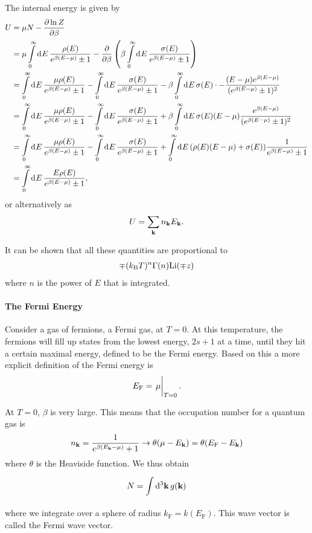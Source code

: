 The internal energy is given by
\begin{align*}
	U &= \mu N - \pdv{\ln{Z}}{\beta} \\
	  &= \mu\int\limits_{0}^{\infty}\dd[]{E}\frac{\rho(E)}{e^{\beta(E - \mu)} \pm 1} - \pdv{\beta}\left(\beta\int\limits_{0}^{\infty}\dd[]{E}\frac{\sigma(E)}{e^{\beta(E - \mu)} \pm 1}\right) \\
	  &= \int\limits_{0}^{\infty}\dd[]{E}\frac{\mu\rho(E)}{e^{\beta(E - \mu)} \pm 1} - \int\limits_{0}^{\infty}\dd[]{E}\frac{\sigma(E)}{e^{\beta(E - \mu)} \pm 1} - \beta\int\limits_{0}^{\infty}\dd[]{E}\sigma(E)\cdot -\frac{(E - \mu)e^{\beta(E - \mu)}}{(e^{\beta(E - \mu)} \pm 1)^{2}} \\
	  &= \int\limits_{0}^{\infty}\dd[]{E}\frac{\mu\rho(E)}{e^{\beta(E - \mu)} \pm 1} - \int\limits_{0}^{\infty}\dd[]{E}\frac{\sigma(E)}{e^{\beta(E - \mu)} \pm 1} + \beta\int\limits_{0}^{\infty}\dd[]{E}\sigma(E)(E - \mu)\frac{e^{\beta(E - \mu)}}{(e^{\beta(E - \mu)} \pm 1)^{2}} \\
	  &= \int\limits_{0}^{\infty}\dd[]{E}\frac{\mu\rho(E)}{e^{\beta(E - \mu)} \pm 1} - \int\limits_{0}^{\infty}\dd[]{E}\frac{\sigma(E)}{e^{\beta(E - \mu)} \pm 1} + \int\limits_{0}^{\infty}\dd[]{E}(\rho(E)(E - \mu) + \sigma(E))\frac{1}{e^{\beta(E - \mu)} \pm 1} \\
	  &= \int\limits_{0}^{\infty}\dd[]{E}\frac{E\rho(E)}{e^{\beta(E - \mu)} \pm 1},
\end{align*}
or alternatively as
\begin{align*}
	U = \sum\limits_{\vb{k}}n_{\vb{k}}E_{\vb{k}}.
\end{align*}

It can be shown that all these quantities are proportional to
\begin{align*}
	\mp(k_{\text{B}} T)^{n}\Gamma(n)\text{Li}(\mp z)
\end{align*}
where $n$ is the power of $E$ that is integrated.

\paragraph{The Fermi Energy}
Consider a gas of fermions, a Fermi gas, at $T = 0$. At this temperature, the fermions will fill up states from the lowest energy, $2s + 1$ at a time, until they hit a certain maximal energy, defined to be the Fermi energy. Based on this a more explicit definition of the Fermi energy is
\begin{align*}
	E_{\text{F}} = \eval{\mu}_{T = 0}.
\end{align*}

At $T = 0$, $\beta$ is very large. This means that the occupation number for a quantum gas is
\begin{align*}
	n_{\vb{k}} = \frac{1}{e^{\beta(E_{\vb{k}} - \mu)} + 1} \to \theta(\mu - E_{\vb{k}}) = \theta(E_{\text{F}} - E_{\vb{k}})
\end{align*}
where $\theta$ is the Heaviside function. We thus obtain
\begin{align*}
	N = \int\limits_{}^{}\dd[3]{\vb{k}}g(\vb{k})
\end{align*}
where we integrate over a sphere of radius $k_{\text{F}} = k(E_{\text{F}})$. This wave vector is called the Fermi wave vector.

